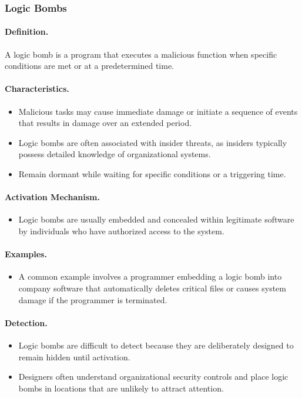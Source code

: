 \subsubsection{Logic Bombs}

\paragraph{Definition.}
A logic bomb is a program that executes a malicious function when specific conditions are met or at a predetermined time.

\paragraph{Characteristics.}
\begin{itemize}
  \item Malicious tasks may cause immediate damage or initiate a sequence of events that results in damage over an extended period.
  \item Logic bombs are often associated with insider threats, as insiders typically possess detailed knowledge of organizational systems.
  \item Remain dormant while waiting for specific conditions or a triggering time.
\end{itemize}

\paragraph{Activation Mechanism.}
\begin{itemize}
  \item Logic bombs are usually embedded and concealed within legitimate software by individuals who have authorized access to the system.
\end{itemize}

\paragraph{Examples.}
\begin{itemize}
  \item A common example involves a programmer embedding a logic bomb into company software that automatically deletes critical files or causes system damage if the programmer is terminated.
\end{itemize}

\paragraph{Detection.}
\begin{itemize}
  \item Logic bombs are difficult to detect because they are deliberately designed to remain hidden until activation.
  \item Designers often understand organizational security controls and place logic bombs in locations that are unlikely to attract attention.
\end{itemize}

